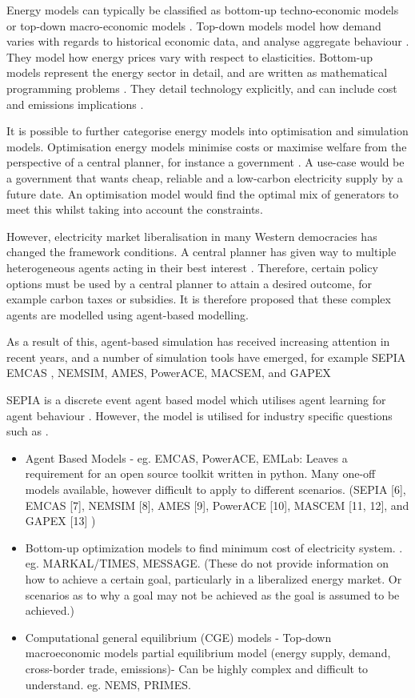 
Energy models can typically be classified as bottom-up techno-economic models or top-down macro-economic models \cite{Bohringer1998}. Top-down models model how demand varies with regards to historical economic data, and analyse aggregate behaviour \cite{Hall2016}. They model how energy prices vary with respect to elasticities. Bottom-up models represent the energy sector in detail, and are written as mathematical programming problems \cite{Gargiulo2013}. They detail technology explicitly, and can include cost and emissions implications \cite{Hall2016}.

It is possible to further categorise energy models into optimisation and simulation models. Optimisation energy models minimise costs or maximise welfare from the perspective of a central planner, for instance a government \cite{Keles2017}. A use-case would be a government that wants cheap, reliable and a low-carbon electricity supply by a future date. An optimisation model would find the optimal mix of generators to meet this whilst taking into account the constraints. 

However, electricity market liberalisation in many Western democracies has changed the framework conditions. A central planner has given way to multiple heterogeneous agents acting in their best interest \cite{Most2010}. Therefore, certain policy options must be used by a central planner to attain a desired outcome, for example carbon taxes or subsidies. It is therefore proposed that these complex agents are modelled using agent-based modelling.

As a result of this, agent-based simulation has received increasing attention in recent years, and a number of simulation tools have emerged, for example SEPIA\cite{Kraan2018} EMCAS \cite{Conzelmann}, NEMSIM, AMES, PowerACE, MACSEM, and GAPEX

SEPIA is a discrete event agent based model which utilises agent learning for agent behaviour \cite{Harp2000}. However, the model is utilised for industry specific questions such as .

\begin{itemize}
	\item Agent Based Models - eg. EMCAS, PowerACE, EMLab: Leaves a requirement for an open source toolkit written in python. Many one-off models available, however difficult to apply to different scenarios.
	(SEPIA [6], EMCAS [7], NEMSIM [8], AMES [9], PowerACE [10], MASCEM [11, 12], and GAPEX [13] \cite{Lopes})
	\item Bottom-up optimization models to find minimum cost of electricity system. \cite{Pfenninger2014}. eg. MARKAL/TIMES, MESSAGE. (These do not provide information on how to achieve a certain goal, particularly in a liberalized energy market. Or scenarios as to why a goal may not be achieved as the goal is assumed to be achieved.)
	\item Computational general equilibrium (CGE) models - Top-down macroeconomic models partial equilibrium model (energy supply, demand, cross-border trade, emissions)- Can be highly complex and difficult to understand. eg. NEMS, PRIMES.
\end{itemize}



